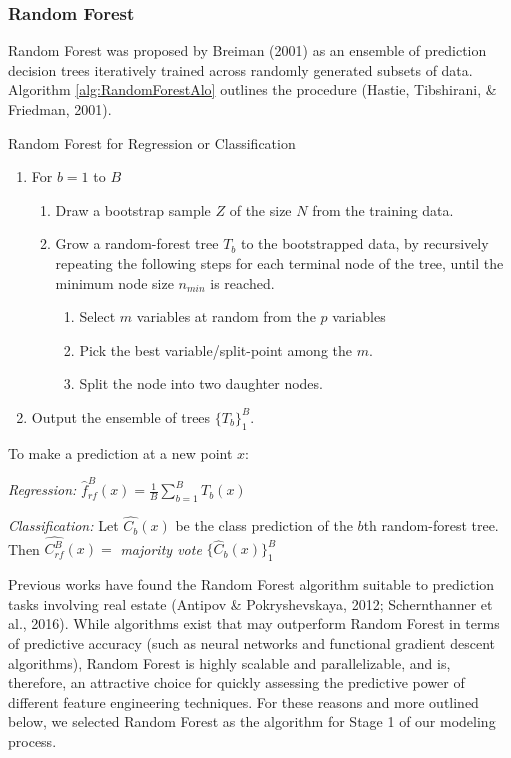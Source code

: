 \documentclass[12pt,]{article}
\begin{document}
\hypertarget{random-forest}{%
\subsubsection{Random Forest}\label{random-forest}}

Random Forest was proposed by Breiman (2001) as an ensemble of
prediction decision trees iteratively trained across randomly generated
subsets of data. Algorithm \ref{alg:RandomForestAlo} outlines the
procedure (Hastie, Tibshirani, \& Friedman, 2001).

\begin{algorithm}
  \caption{Random Forest for Regression or Classification}\label{alg:RandomForestAlo}

\begin{enumerate}
  \item For $b = 1$ to $B$
  \begin{enumerate}
    \item Draw a bootstrap sample $Z$ of the size $N$ from the training data.
    \item Grow a random-forest tree $T_b$ to the bootstrapped data, by recursively repeating the following steps for each terminal node of the tree, until the minimum node size $n_{min}$ is reached.
  \begin{enumerate}
    \item Select $m$ variables at random from the $p$ variables
    \item Pick the best variable/split-point among the $m$.
    \item Split the node into two daughter nodes.
  \end{enumerate}
  \end{enumerate}
  \item Output the ensemble of trees $\{T_b\}_1^B$.
\end{enumerate}

To make a prediction at a new point $x$:

\textit{Regression:} $\hat{f}_{rf}^B(x) = \frac{1}{B}\sum_{b=1}^{B}T_b(x)$

\textit{Classification:} Let $\hat{C_b}(x)$ be the class prediction of the $b$th random-forest tree. Then $\hat{C_{rf}^B}(x)=$ \textit{majority vote} $\{\hat{C}_{b}(x)\}_1^B $

\end{algorithm}

Previous works have found the Random Forest algorithm suitable to
prediction tasks involving real estate (Antipov \& Pokryshevskaya, 2012;
Schernthanner et al., 2016). While algorithms exist that may outperform
Random Forest in terms of predictive accuracy (such as neural networks
and functional gradient descent algorithms), Random Forest is highly
scalable and parallelizable, and is, therefore, an attractive choice for
quickly assessing the predictive power of different feature engineering
techniques. For these reasons and more outlined below, we selected
Random Forest as the algorithm for Stage 1 of our modeling process.
\end{document}
